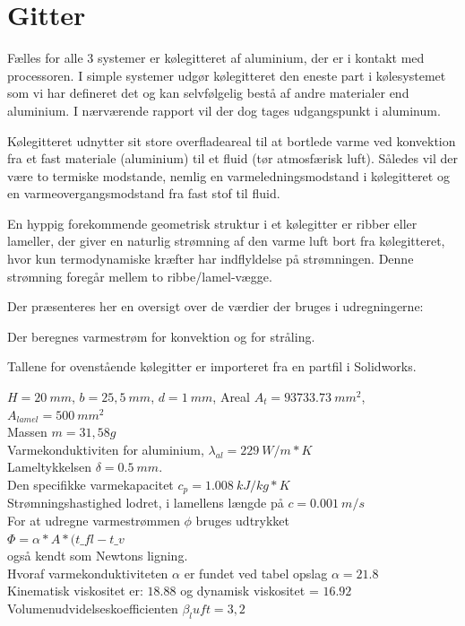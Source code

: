 \section{Gitter}

Fælles for alle 3 systemer er kølegitteret af aluminium, der er i kontakt med processoren. 
I simple systemer udgør kølegitteret den eneste part i kølesystemet som vi har defineret det og kan selvfølgelig bestå af andre materialer end aluminium. I nærværende rapport vil der dog tages udgangspunkt i aluminum.

Kølegitteret udnytter sit store overfladeareal til at bortlede varme ved konvektion fra et fast materiale (aluminium) til et fluid (tør atmosfærisk luft).
Således vil der være to termiske modstande, nemlig en varmeledningsmodstand i kølegitteret og en varmeovergangsmodstand fra fast stof til fluid.

En hyppig forekommende geometrisk struktur i et kølegitter er ribber eller lameller, der giver en naturlig strømning af den varme luft bort fra kølegitteret, hvor kun termodynamiske kræfter har indflyldelse på strømningen. Denne strømning foregår mellem to ribbe/lamel-vægge. 

Der præsenteres her en oversigt over de værdier der bruges i udregningerne: 

Der beregnes varmestrøm for konvektion og for stråling.

Tallene for ovenstående kølegitter er importeret fra en partfil i Solidworks. %

$H = 20\ mm$, $b = 25,5\ mm$, $d = 1\ mm$, Areal $A_t = 93733.73\ mm^2$, $A_{lamel}= 500\ mm^2$  \\ 
Massen $m = 31,58 g$ \\
Varmekonduktiviten for aluminium, $\lambda_{al} = 229\ W/m*K$ \\  
Lameltykkelsen $\delta = 0.5\ mm.$  \\
Den specifikke varmekapacitet $c_{p} = 1.008\ kJ/kg*K$ \\
Strømningshastighed lodret, i lamellens længde på $c = 0.001\ m/s$ \\

For at udregne varmestrømmen $\phi$  bruges udtrykket \\ $\Phi = \alpha * A* (t\_{fl}-t\_v$ \\  også kendt som Newtons ligning. \\ 
Hvoraf varmekonduktiviteten $\alpha$ er fundet ved tabel opslag $\alpha = 21.8$ \\
Kinematisk viskositet er: $18.88$ og dynamisk viskositet = $16.92$  \\
Volumenudvidelseskoefficienten $\beta_luft = 3,2$ \\
 
